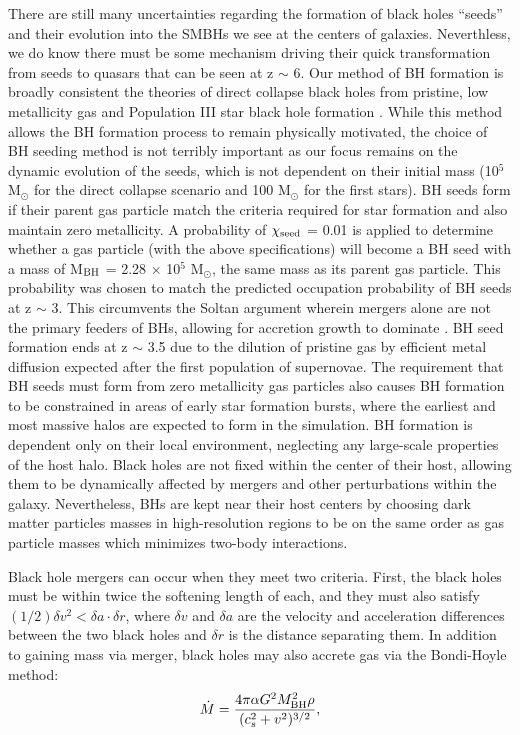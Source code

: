 \documentclass[manuscript]{aastex}
\begin{document}
 There are still many uncertainties regarding the formation of black holes ``seeds'' and their evolution into the SMBHs we see at the centers of galaxies. Neverthless, we do know there must be some mechanism driving their quick transformation from seeds to quasars that can be seen at z $\sim$ 6. \citep{Fan2001} Our method of BH formation is broadly consistent the theories of direct collapse black holes from pristine, low metallicity gas \citep[][Add Abel 2002]{Couchman1986, Bromm2004} and Population III star black hole formation \citep{Loeb1994, Eisenstein1995, Koushiappas2004, Begelman2006, Lodato2006}. While this method allows the BH formation process to remain physically motivated, the choice of BH seeding method is not terribly important as our focus remains on the dynamic evolution of the seeds, which is not dependent on their initial mass (10$^5$ M$_{\odot}$ for the direct collapse scenario and 100 M$_{\odot}$ for the first stars). BH seeds form if their parent gas particle match the criteria required for star formation and also maintain zero metallicity. \citep{Stinson2006} A probability of $\chi_{\rm seed}$ = 0.01 is applied to determine whether a gas particle (with the above specifications) will become a BH seed with a mass of M$_{\rm BH}$ = 2.28 $\times$ 10$^5$ M$_{\odot}$, the same mass as its parent gas particle. This probability was chosen to match the predicted occupation probability of BH seeds at z $\sim$ 3. \citep{Volonteri2008} This circumvents the Soltan argument wherein mergers alone are not the primary feeders of BHs, allowing for accretion growth to dominate \citep{Soltan1982}.  BH seed formation ends at z $\sim$ 3.5 due to the dilution of pristine gas by efficient metal diffusion expected after the first population of supernovae. The requirement that BH seeds must form from zero metallicity gas particles also causes BH formation to be constrained in areas of early star formation bursts, where the earliest and most massive halos are expected to form in the simulation. BH formation is dependent only on their local environment, neglecting any large-scale properties of the host halo. Black holes are not fixed within the center of their host, allowing them to be dynamically affected by mergers and other perturbations within the galaxy. Nevertheless, BHs are kept near their host centers by choosing dark matter particles masses in high-resolution regions to be on the same order as gas particle masses which minimizes two-body interactions. \citep{Bellovary2010,Zolotov2012}

Black hole mergers can occur when they meet two criteria. First, the black holes must be within twice the softening length of each, and they must also satisfy $(1/2) \delta v^2 < \delta a \cdot \delta r$,  where $\delta v$ and $\delta a$ are the velocity and acceleration differences between the two black holes and $\delta r$ is the distance separating them. In addition to gaining mass via merger, black holes may also accrete gas via the Bondi-Hoyle method:
\begin{equation}
\dot{M} = \frac{4 \pi \alpha G^2 M^{2}_{\rm BH} \rho}{(c^{2}_{s} + v^2)^{3/2}},
\end{equation}
\end{document}
